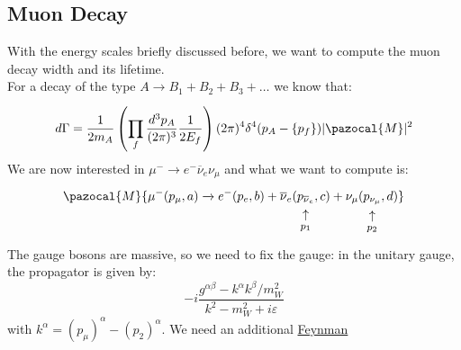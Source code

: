 \documentclass[../main.tex]{subfiles}
\begin{document}
\subsection{Muon Decay}
With the energy scales briefly discussed before, we want to compute the muon decay width and its lifetime.\\
For a decay of the type $A\xrightarrow[]{}B_1+B_2+B_3+\dots$ we know that:
\[
d\Gamma=\frac{1}{2m_A}\left(\prod_f\frac{d^3p_A}{(2\pi)^3}\frac{1}{2E_f}\right)(2\pi)^4\delta^4(p_A-\{p_f\})|\pazocal{M}|^2
\]
We are now interested in $\mu^-\xrightarrow[]{}e^-\overline{\nu}_e\nu_\mu$
and what we want to compute is:
\[
\pazocal{M}\{\mu^-(p_\mu,a)\xrightarrow[]{}e^-(p_e,b)+\overline{\nu}_e(\underset{\mathclap{\tikz \node {$\uparrow$} node [below=1ex] {\footnotesize $p_1$};}}{p_{\overline{\nu}_e}},c)+\nu_\mu(\underset{\mathclap{\tikz \node {$\uparrow$} node [below=1ex] {\footnotesize $p_2$};}}{p_{\nu_\mu}},d)\}
\]
The gauge bosons are massive, so we need to fix the gauge: in the unitary gauge, the propagator is given by: 
\[
-i\frac{g^{\alpha\beta}-k^\alpha k^\beta/m_W^2}{k^2-m^2_W+i\varepsilon}
\]
with $k^\alpha=(p_\mu)^\alpha-(p_2)^\alpha$. We need an additional \href{https://en.wikipedia.org/wiki/Richard_Feynman}{Feynman}
\end{document}
